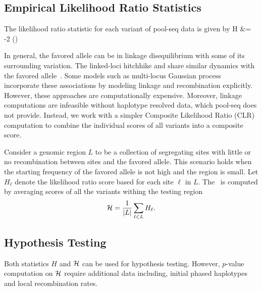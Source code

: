 \subsection{Empirical Likelihood Ratio Statistics}
The  likelihood
ratio statistic for each variant of pool-seq data is given by
\beq
	H &= -2 \log 
	\left(\right)\\
	\label{eq:ELRS}
\eeq

In general, the favored allele can be in linkage disequilibrium with
some of its surrounding variation. The linked-loci hitchhike and share
similar dynamics with the favored allele~\cite{elyashiv2016genomic}.  Some
models such as
multi-locus Gaussian process~\cite{Terhorst2015Multi} incorporate
these associations by modeling linkage and recombination
explicitly. However, these approaches are computationally
expensive. Moreover, linkage computations are infeasible without
haplotype resolved data, which pool-seq does not provide. Instead, we
work with a simpler Composite Likelihood Ratio
(CLR)~\cite{nielsen2005genomic,williamson2007localizing} computation
to combine the individual scores of all variants into a composite
score.


Consider a genomic region $L$ to be a collection of segregating sites
with little or no recombination between sites and the favored
allele. This scenario holds when the starting frequency of the favored
allele is not high and the region is small. Let  $H_\ell$ denote the likelihood 
ratio score based for each site $\ell$ in $L$. The \comale\ is computed by 
averaging scores of all the variants
withing the testing region
\begin{equation}
 {\cal H} = \frac{1}{|L|}\sum_{\ell \in L} H_\ell.
\label{eq:pihmm}
\end{equation}


\subsection{Hypothesis Testing}
Both statistics $H$ and ${\cal H}$ can be used for hypothesis testing. However, 
$p$-value computation on ${\cal H}$ require additional data including, initial 
phased haplotypes and local recombination rates. 

